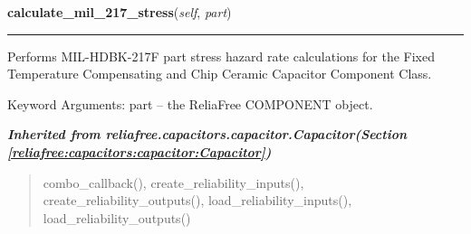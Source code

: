     \vspace{0.5ex}

\hspace{.8\funcindent}\begin{boxedminipage}{\funcwidth}

    \raggedright \textbf{calculate\_mil\_217\_stress}(\textit{self}, \textit{part})

    \vspace{-1.5ex}

    \rule{\textwidth}{0.5\fboxrule}
\setlength{\parskip}{2ex}
    Performs MIL-HDBK-217F part stress hazard rate calculations for the 
    Fixed Temperature Compensating and Chip Ceramic Capacitor Component 
    Class.

    Keyword Arguments: part -- the ReliaFree COMPONENT object.

\setlength{\parskip}{1ex}
    \end{boxedminipage}


\large{\textbf{\textit{Inherited from reliafree.capacitors.capacitor.Capacitor\textit{(Section \ref{reliafree:capacitors:capacitor:Capacitor})}}}}

\begin{quote}
combo\_callback(), create\_reliability\_inputs(), create\_reliability\_outputs(), load\_reliability\_inputs(), load\_reliability\_outputs()
\end{quote}
